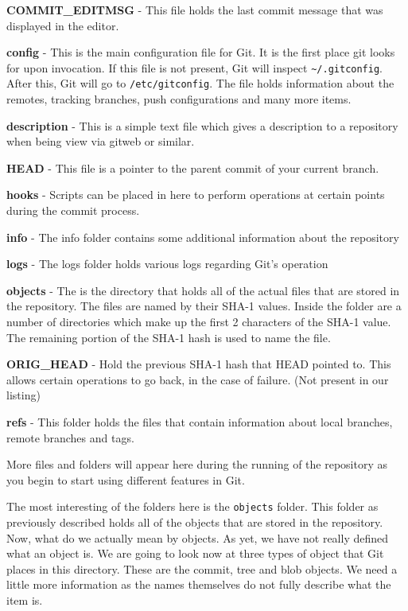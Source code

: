 \textbf{COMMIT\_EDITMSG} - This file holds the last commit message that was displayed in the editor.

\textbf{config} - This is the main configuration file for Git.
It is the first place git looks for upon invocation.
If this file is not present, Git will inspect \texttt{\textasciitilde/.gitconfig}.
After this, Git will go to \texttt{/etc/gitconfig}.
The file holds information about the remotes, tracking branches, push configurations and many more items.

\textbf{description} - This is a simple text file which gives a description to a repository when being view via gitweb or similar.

\textbf{HEAD} - This file is a pointer to the parent commit of your current branch.

\textbf{hooks} - Scripts can be placed in here to perform operations at certain points during the commit process.

\textbf{info} - The info folder contains some additional information about the repository

\textbf{logs} - The logs folder holds various logs regarding Git's operation

\textbf{objects} - The is the directory that holds all of the actual files that are stored in the repository.
The files are named by their SHA-1 values.
Inside the folder are a number of directories which make up the first 2 characters of the SHA-1 value.
The remaining portion of the SHA-1 hash is used to name the file.

\textbf{ORIG\_HEAD} - Hold the previous SHA-1 hash that HEAD pointed to.
This allows certain operations to go back, in the case of failure.
(Not present in our listing)

\textbf{refs} - This folder holds the files that contain information about local branches, remote branches and tags.

More files and folders will appear here during the running of the repository as you begin to start using different features in Git.

The most interesting of the folders here is the \texttt{objects} folder.
This folder as previously described holds all of the objects that are stored in the repository.
Now, what do we actually mean by objects.
As yet, we have not really defined what an object is.
We are going to look now at three types of object that Git places in this directory.
These are the commit, tree and blob objects.
We need a little more information as the names themselves do not fully describe what the item is.

